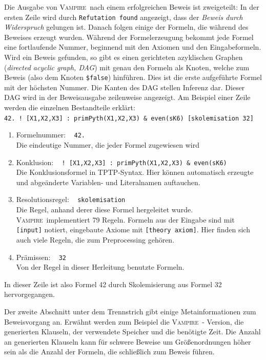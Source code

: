 \documentclass{article}
\newcommand{\vampire}{\textsc{Vampire}~}
\begin{document}
Die Ausgabe von \vampire nach einem erfolgreichen Beweis ist zweigeteilt:
In der ersten Zeile wird durch \verb|Refutation found| angezeigt, dass der 
\emph{Beweis durch Widerspruch} gelungen ist. Danach folgen einige der Formeln, 
die während des Beweises erzeugt wurden. 
Während der Formelerzeugung bekommt jede Formel eine fortlaufende Nummer, beginnend mit den Axiomen und den Eingabeformeln. Wird ein Beweis gefunden, so gibt es einen gerichteten azyklischen Graphen (\emph{directed acyclic graph, DAG}) mit genau den Formeln als Knoten, welche zum Beweis (also dem Knoten \texttt{\$false}) hinführen. Dies ist die erste aufgeführte Formel mit der höchsten Nummer.
Die Kanten des DAG stellen Inferenz dar. Dieser DAG wird in der Beweisausgabe zeilenweise angezeigt. 
Am Beispiel einer Zeile werden die einzelnen Bestandteile erklärt:\\ 

\verb|42. ! [X1,X2,X3] : primPyth(X1,X2,X3) & even(sK6) [skolemisation 32]|
\begin{enumerate}
	\itemsep0em 
	\item Formelnummer: ~ \verb|42.|\\
	Die eindeutige Nummer, die jeder Formel zugewiesen wird
	\item Konklusion: ~ \verb|! [X1,X2,X3] : primPyth(X1,X2,X3) & even(sK6)|\\
	Die Konklusionsformel in TPTP-Syntax. Hier können automatisch erzeugte und abgeänderte
	Variablen- und Literalnamen auftauchen.
	\item Resolutionsregel: ~ \verb|skolemisation|\\
	Die Regel, anhand derer diese Formel hergeleitet wurde. \vampire implementiert 79 Regeln.
	Formeln aus der Eingabe sind mit \verb|[input]| notiert, eingebaute Axiome mit \verb|[theory axiom]|. Hier finden sich auch viele Regeln, die zum Preprocessing gehören.
	\item Prämissen: ~ \verb|32|\\
	Von der Regel in dieser Herleitung benutzte Formeln.
\end{enumerate}
In dieser Zeile ist also Formel 42 durch Skolemisierung aus Formel 32 hervorgegangen.


Der zweite Abschnitt unter dem Trennstrich gibt einige Metainformationen zum Beweisvorgang an.
Erwähnt werden zum Beispiel die \vampire - Version, die generierten Klauseln, der verwendete Speicher
und die benötigte Zeit. Die Anzahl an generierten Klauseln kann für schwere Beweise um Größenordnungen 
höher sein als die Anzahl der Formeln, die schließlich zum Beweis führen.
\end{document}
